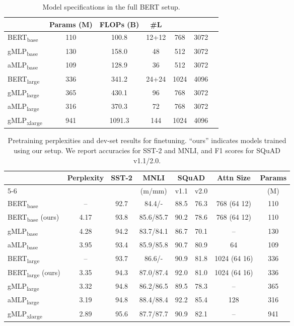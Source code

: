 \documentclass{article}
\begin{document}
\begin{table}[h]
\caption{Model specifications in the full BERT setup.}
\label{tab:perplexity-full-bert}
\small
\centering
\begin{tabular}{@{}l|cc|cccc@{}}
\toprule
 & Params (M) & FLOPs (B) & \#L &  &  \\
\midrule
BERT\textsubscript{base} & 110 & 100.8  & 12+12 & 768 & 3072 \\
gMLP\textsubscript{base} & 130 & 158.0 & 48 & 512 & 3072  \\
aMLP\textsubscript{base} & 109 & 128.9 & 36 & 512 & 3072  \\
\midrule
BERT\textsubscript{large} & 336 & 341.2 &  24+24 & 1024 & 4096  \\
gMLP\textsubscript{large} & 365 & 430.1 & 96 & 768 & 3072  \\
aMLP\textsubscript{large} & 316 & 370.3 & 72 & 768 & 3072 \\
\midrule
gMLP\textsubscript{xlarge} & 941 & 1091.3 & 144 & 1024 & 4096 \\
\bottomrule
\end{tabular}
\end{table}


\begin{table}[h]
\centering
\caption{Pretraining perplexities and dev-set results for finetuning. ``ours'' indicates models trained using our setup. We report accuracies for SST-2 and MNLI, and F1 scores for SQuAD v1.1/2.0.}
\begin{tabular}{@{}l|c|cccc|cc@{}}
\toprule
 & \multirow{2}{*}{Perplexity} & \multirow{2}{*}{SST-2} & \multirow{2}{*}{MNLI} & \multicolumn{2}{c|}{SQuAD} & \multirow{2}{*}{Attn Size} & Params \\ \cmidrule(l){5-6}
 & & & (m/mm) & v1.1 & v2.0 & & (M)\\
\midrule
\midrule
BERT\textsubscript{base}~\cite{devlin2018bert} & -- & 92.7 & 84.4/- & 88.5 & 76.3 & 768 (64  12) & 110 \\
\midrule
BERT\textsubscript{base} (ours) & 4.17 & 93.8 & 85.6/85.7 & 90.2 & 78.6 & 768 (64  12) & 110  \\
gMLP\textsubscript{base} & 4.28 & 94.2 & 83.7/84.1 & 86.7 & 70.1 & -- & 130 \\
aMLP\textsubscript{base} & 3.95 & 93.4 & 85.9/85.8 & 90.7 & 80.9 & 64 & 109 \\
\midrule
\midrule
BERT\textsubscript{large}~\cite{devlin2018bert} & -- & 93.7 & 86.6/- & 90.9 & 81.8 & 1024 (64  16) & 336 \\
\midrule
BERT\textsubscript{large} (ours) & 3.35 & 94.3 & 87.0/87.4 & 92.0 & 81.0 & 1024 (64  16) & 336 \\
gMLP\textsubscript{large} & 3.32 & 94.8 & 86.2/86.5 & 89.5 & 78.3 & -- & 365 \\
aMLP\textsubscript{large} & 3.19 & 94.8 & 88.4/88.4 & 92.2 & 85.4 & 128 & 316 \\
\midrule\midrule
gMLP\textsubscript{xlarge} & 2.89 & 95.6 & 87.7/87.7 & 90.9 & 82.1 & -- & 941 \\
\bottomrule
\end{tabular}
\label{tab:finetune-full-bert}
\end{table}
\end{document}
